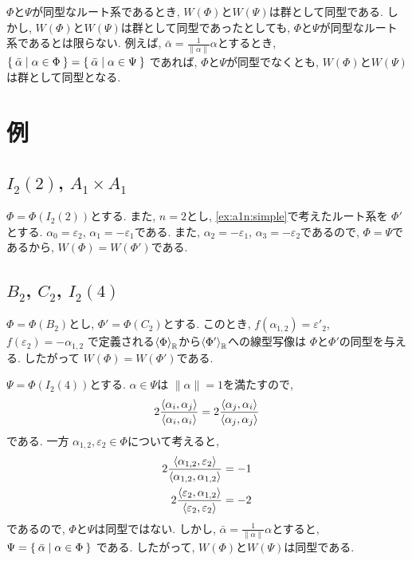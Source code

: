 \begin{remark}
  $\Phi$と$\Psi$が同型なルート系であるとき,
  $W(\Phi)$と$W(\Psi)$は群として同型である.
  しかし,
  $W(\Phi)$と$W(\Psi)$は群として同型であったとしても,
  $\Phi$と$\Psi$が同型なルート系であるとは限らない.
  例えば, $\bar\alpha=\frac{1}{\|\alpha\|}\alpha$とするとき,
  $\Set{\bar\alpha| \alpha\in \Phi}=\Set{\bar\alpha| \alpha\in \Psi}$
  であれば,
  $\Phi$と$\Psi$が同型でなくとも,
  $W(\Phi)$と$W(\Psi)$は群として同型となる.
\end{remark}

\section{例}
\subsection{$I_2(2)$, $A_1\times A_1$}
$\Phi=\Phi(I_2(2))$とする.
また,
$n=2$とし, 
\cref{ex:a1n:simple}で考えたルート系を
$\Phi'$とする.
$\alpha_0=\varepsilon_2$,
$\alpha_1=-\varepsilon_1$である.
また,
$\alpha_2=-\varepsilon_1$,
$\alpha_3=-\varepsilon_2$であるので,
$\Phi=\Psi$であるから, $W(\Phi)=W(\Phi')$である.

\subsection{$B_2$, $C_2$, $I_2(4)$}
$\Phi=\Phi(B_2)$とし,
$\Phi'=\Phi(C_2)$とする.
このとき,
$f(\alpha_{1,2})=\varepsilon'_2$,
$f(\varepsilon_2)=-\alpha_{1,2}$
で定義される$\Braket{\Phi}_{\mathbb{R}}$から$\Braket{\Phi'}_{\mathbb{R}}$への線型写像は
$\Phi$と$\Phi'$の同型を与える.
したがって
$W(\Phi)=W(\Phi')$である.

$\Psi=\Phi(I_2(4))$とする.
$\alpha\in \Psi$は
$\|\alpha\|=1$を満たすので,
\begin{align*}
  2\frac{\Braket{\alpha_i,\alpha_j}}{\Braket{\alpha_i,\alpha_i}}
= 2\frac{\Braket{\alpha_j,\alpha_i}}{\Braket{\alpha_j,\alpha_j}}
\end{align*}
である.
一方
$\alpha_{1,2},\varepsilon_2 \in \Phi$について考えると,
\begin{align*}
  2\frac{\Braket{\alpha_{1,2},\varepsilon_2}}{\Braket{\alpha_{1,2},\alpha_{1,2}}}
  &=-1\\
  2\frac{\Braket{\varepsilon_2,\alpha_{1,2}}}{\Braket{\varepsilon_2,\varepsilon_2}}
  &=-2
\end{align*}
であるので,
$\Phi$と$\Psi$は同型ではない.
しかし,
$\bar\alpha=\frac{1}{\|\alpha\|}\alpha$とすると,
$\Psi=\Set{\bar\alpha| \alpha\in \Phi}$
である.
したがって, $W(\Phi)$と$W(\Psi)$は同型である.

